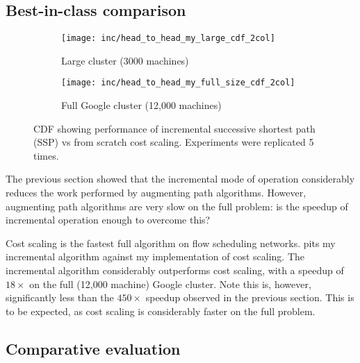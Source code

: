 
\subsection{Best-in-class comparison}

\begin{figure}
    \begin{widepage}
        \begin{subfigure}[c]{0.5\textwidth}
            \texttt{[image: inc/head\_to\_head\_my\_large\_cdf\_2col]}
            \caption{Large cluster (3000 machines)}
        \end{subfigure}
        \begin{subfigure}[c]{0.5\textwidth}
            \texttt{[image: inc/head\_to\_head\_my\_full\_size\_cdf\_2col]}
            \caption{Full Google cluster (12,000 machines)}
        \end{subfigure}
    \end{widepage}
    \caption[Performance of incremental successive shortest path vs from scratch cost scaling]{CDF showing performance of incremental successive shortest path (SSP) vs from scratch cost scaling. Experiments were replicated 5 times.}
    \label{fig:inc-head-to-head-my}
\end{figure}

The previous section showed that the incremental mode of operation considerably reduces the work performed by augmenting path algorithms. However, augmenting path algorithms are very slow on the full problem\footnotemark: is the speedup of incremental operation enough to overcome this?

Cost scaling is the fastest full algorithm on flow scheduling networks.  pits my incremental algorithm against my implementation of cost scaling. The incremental algorithm considerably outperforms cost scaling, with a speedup of $18\times$ on the full (12,000 machine) Google cluster. Note this is, however, significantly less than the $450\times$ speedup observed in the previous section. This is to be expected, as cost scaling is considerably faster on the full problem.

\subsection{Comparative evaluation}

